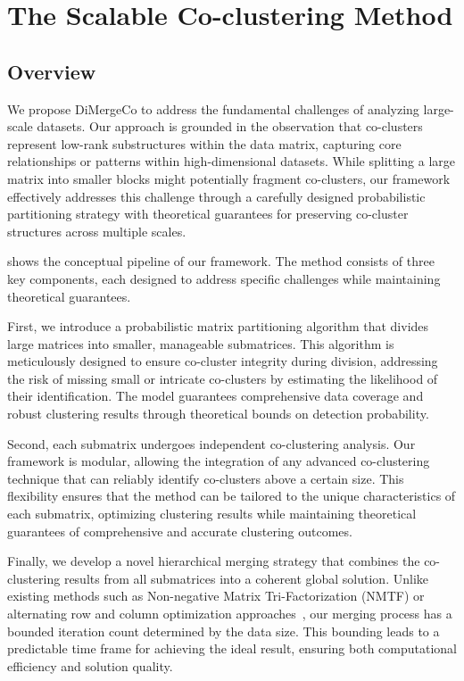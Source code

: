 \documentclass[journal]{IEEEtran}
\theoremstyle{definition}
\theoremstyle{remark} %
\renewcommand{\cite}[1]{~\autocite{#1}}
\begin{document}
\section{The Scalable Co-clustering Method}
\label{sec:proposed-model}

\subsection{Overview}
\label{subsec:overview}
We propose DiMergeCo to address the fundamental challenges of analyzing large-scale datasets. Our approach is grounded in the observation that co-clusters represent low-rank substructures within the data matrix, capturing core relationships or patterns within high-dimensional datasets. While splitting a large matrix into smaller blocks might potentially fragment co-clusters, our framework effectively addresses this challenge through a carefully designed probabilistic partitioning strategy with theoretical guarantees for preserving co-cluster structures across multiple scales.

 shows the conceptual pipeline of our framework. The method consists of three key components, each designed to address specific challenges while maintaining theoretical guarantees.

First, we introduce a probabilistic matrix partitioning algorithm that divides large matrices into smaller, manageable submatrices. This algorithm is meticulously designed to ensure co-cluster integrity during division, addressing the risk of missing small or intricate co-clusters by estimating the likelihood of their identification. The model guarantees comprehensive data coverage and robust clustering results through theoretical bounds on detection probability.

Second, each submatrix undergoes independent co-clustering analysis. Our framework is modular, allowing the integration of any advanced co-clustering technique that can reliably identify co-clusters above a certain size. This flexibility ensures that the method can be tailored to the unique characteristics of each submatrix, optimizing clustering results while maintaining theoretical guarantees of comprehensive and accurate clustering outcomes.

Finally, we develop a novel hierarchical merging strategy that combines the co-clustering results from all submatrices into a coherent global solution. Unlike existing methods such as Non-negative Matrix Tri-Factorization (NMTF) or alternating row and column optimization approaches\cite{wang2011FastNonnegativeMatrix}, our merging process has a bounded iteration count determined by the data size. This bounding leads to a predictable time frame for achieving the ideal result, ensuring both computational efficiency and solution quality.
\end{document}
